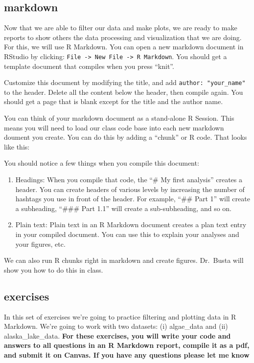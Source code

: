 \documentclass[
]{krantz}
\begin{document}
\hypertarget{markdown}{%
\subsection{markdown}\label{markdown}}

Now that we are able to filter our data and make plots, we are ready to make reports to show others the data processing and visualization that we are doing. For this, we will use R Markdown. You can open a new markdown document in RStudio by clicking: \texttt{File\ -\textgreater{}\ New\ File\ -\textgreater{}\ R\ Markdown}. You should get a template document that compiles when you press ``knit''.

Customize this document by modifying the title, and add \texttt{author:\ "your\_name"} to the header. Delete all the content below the header, then compile again. You should get a page that is blank except for the title and the author name.

You can think of your markdown document as a stand-alone R Session. This means you will need to load our class code base into each new markdown doument you create. You can do this by adding a ``chunk'' or R code. That looks like this:

You should notice a few things when you compile this document:

\begin{enumerate}
\def\labelenumi{\arabic{enumi}.}
\item
  Headings: When you compile that code, the ``\# My first analysis'' creates a header. You can create headers of various levels by increasing the number of hashtags you use in front of the header. For example, ``\#\# Part 1'' will create a subheading, ``\#\#\# Part 1.1'' will create a sub-subheading, and so on.
\item
  Plain text: Plain text in an R Markdown document creates a plan text entry in your compiled document. You can use this to explain your analyses and your figures, etc.
\end{enumerate}

We can also run R chunks right in markdown and create figures. Dr.~Busta will show you how to do this in class.

\hypertarget{exercises}{%
\subsection{exercises}\label{exercises}}

In this set of exercises we're going to practice filtering and plotting data in R Markdown. We're going to work with two datasets: (i) algae\_data and (ii) alaska\_lake\_data. \textbf{For these exercises, you will write your code and answers to all questions in an R Markdown report, compile it as a pdf, and submit it on Canvas. If you have any questions please let me know}
\end{document}
